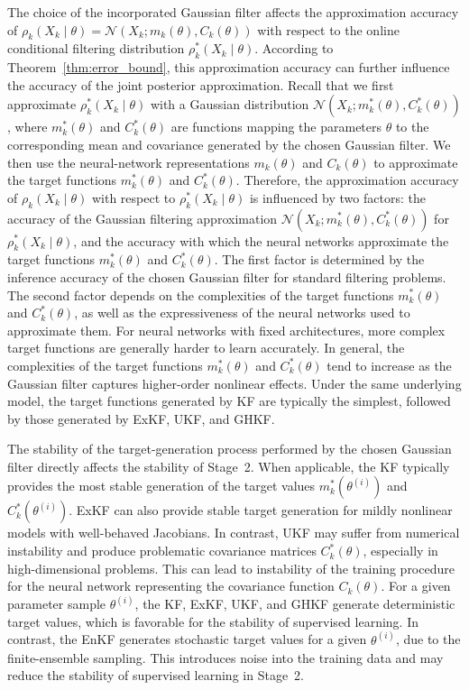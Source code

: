 \documentclass[preprint,3p,times]{elsarticle}
\begin{document}
The choice of the incorporated Gaussian filter affects the approximation accuracy of $\rho_k(X_k \mid \theta)=\mathcal{N}(X_k;m_k(\theta),C_k(\theta))$ with respect to the online conditional filtering distribution $\rho_k^*(X_k \mid \theta)$. According to Theorem~\ref{thm:error_bound}, this approximation accuracy can further influence the accuracy of the joint posterior approximation. Recall that we first approximate $\rho_k^*(X_k \mid \theta)$ with a Gaussian distribution $\mathcal{N}(X_k;m_k^*(\theta),C_k^*(\theta))$, where $m_k^*(\theta)$ and $C_k^*(\theta)$ are functions mapping the parameters $\theta$ to the corresponding mean and covariance generated by the chosen Gaussian filter. We then use the neural-network representations $m_k(\theta)$ and $C_k(\theta)$ to approximate the target functions $m_k^*(\theta)$ and $C_k^*(\theta)$. Therefore, the approximation accuracy of $\rho_k(X_k \mid \theta)$ with respect to $\rho_k^*(X_k \mid \theta)$ is influenced by two factors: the accuracy of the Gaussian filtering approximation $\mathcal{N}(X_k;m_k^*(\theta),C_k^*(\theta))$ for $\rho_k^*(X_k \mid \theta)$, and the accuracy with which the neural networks approximate the target functions $m_k^*(\theta)$ and $C_k^*(\theta)$. The first factor is determined by the inference accuracy of the chosen Gaussian filter for standard filtering problems. The second factor depends on the complexities of the target functions $m_k^*(\theta)$ and $C_k^*(\theta)$, as well as the expressiveness of the neural networks used to approximate them. For neural networks with fixed architectures, more complex target functions are generally harder to learn accurately. In general, the complexities of the target functions $m_k^*(\theta)$ and $C_k^*(\theta)$ tend to increase as the Gaussian filter captures higher-order nonlinear effects. Under the same underlying model, the target functions generated by KF are typically the simplest, followed by those generated by ExKF, UKF, and GHKF.

The stability of the target-generation process performed by the chosen Gaussian filter directly affects the stability of Stage~2. When applicable, the KF typically provides the most stable generation of the target values $m^*_k(\theta^{(i)})$ and $C^*_k(\theta^{(i)})$. ExKF can also provide stable target generation for mildly nonlinear models with well-behaved Jacobians. In contrast, UKF may suffer from numerical instability and produce problematic covariance matrices $C_k^*(\theta)$, especially in high-dimensional problems. This can lead to instability of the training procedure for the neural network representing the covariance function $C_k(\theta)$. For a given parameter sample $\theta^{(i)}$, the KF, ExKF, UKF, and GHKF generate deterministic target values, which is favorable for the stability of supervised learning. In contrast, the EnKF generates stochastic target values for a given $\theta^{(i)}$, due to the finite-ensemble sampling. This introduces noise into the training data and may reduce the stability of supervised learning in Stage~2.
\end{document}
